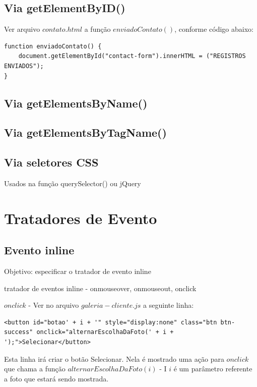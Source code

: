 \subsection{Via getElementByID()}
	Ver arquivo $contato.html$ a função $enviadoContato()$, conforme código abaixo:
	
\begin{lstlisting}
function enviadoContato() {
    document.getElementById("contact-form").innerHTML = ("REGISTROS ENVIADOS");
}
\end{lstlisting}

\subsection{Via getElementsByName()}



\subsection{Via getElementsByTagName()}



\subsection{Via seletores CSS}
  Usados na função querySelector() ou jQuery
  
\section{Tratadores de Evento}
\subsection{Evento inline}
Objetivo: especificar o tratador de evento inline

tratador de eventos inline - onmouseover, onmouseout, onclick

$onclick$ - Ver no arquivo $galeria-cliente.js$ a seguinte linha:

\begin{lstlisting}
<button id="botao' + i + '" style="display:none" class="btn btn-success" onclick="alternarEscolhaDaFoto(' + i + ');">Selecionar</button>
\end{lstlisting}

	Esta linha irá criar o botão Selecionar. Nela é mostrado uma ação para $onclick$ que chama a função $alternarEscolhaDaFoto(i)$ - I $i$ é um parâmetro referente a foto que estará sendo mostrada.

